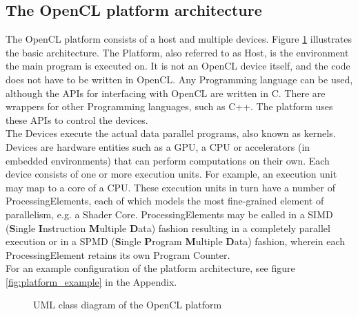 \subsection{The OpenCL platform architecture}
\label{sect:theory_opencl_platform}
The OpenCL platform consists of a host and multiple devices. Figure \ref{fig:theory_platform_model} illustrates the basic architecture. The Platform, also referred to as Host, is the environment the main program is executed on. It is not an OpenCL device itself, and the code does not have to be written in OpenCL. Any Programming language can be used, although the APIs for interfacing with OpenCL are written in C. There are wrappers for other Programming languages, such as C++. The platform uses these APIs to control the devices. \cite{khronos2012specification} \\

The Devices execute the actual data parallel programs, also known as kernels. Devices are hardware entities such as a GPU, a CPU or accelerators (in embedded environments) that can perform computations on their own. Each device consists of one or more execution units. For example, an execution unit may map to a core of a CPU. These execution units in turn have a number of ProcessingElements, each of which models the most fine-grained element of parallelism, e.g. a Shader Core. ProcessingElements may be called in a SIMD (\textbf{S}ingle \textbf{I}nstruction \textbf{M}ultiple \textbf{D}ata) fashion resulting in a completely parallel execution or in a SPMD (\textbf{S}ingle \textbf{P}rogram \textbf{M}ultiple \textbf{D}ata) fashion, wherein each ProcessingElement retains its own Program Counter. \cite{khronos2012specification} \\

For an example configuration of the platform architecture, see figure \ref{fig:platform_example} in the Appendix.

\begin{figure}
	\begin{center}
	\end{center}
	\caption{UML class diagram of the OpenCL platform}
	\label{fig:theory_platform_model}
\end{figure}

